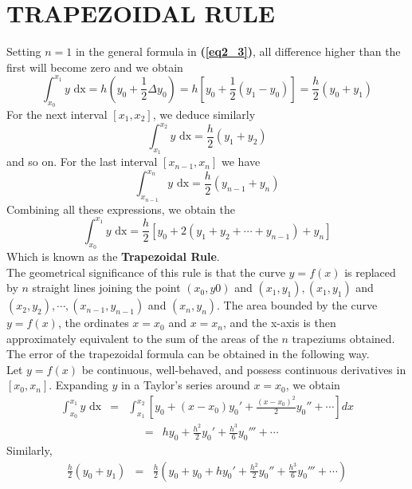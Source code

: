 \documentclass[12pt]{report}
\newcommand{\sps}{\\[0.2cm]}
\newcommand{\refn}[1]{\textbf{(\ref{#1})}}
\newcommand{\bt}[1]{\textbf{#1}}
\newcommand{\sprime}{'}
\newcommand{\dprime}{''}
\newcommand{\tprime}{'''}
\begin{document}
	\section{TRAPEZOIDAL RULE}
	Setting $n=1$ in the general formula in \refn{eq2_3}, all difference higher than the first will become zero and we obtain
	\begin{equation}
		\int_{x_0}^{x_1} y \text{ dx} = h(y_0 + \frac{1}{2}\Delta y_0) = h \left[ y_0 + \frac{1}{2} (y_1 - y_0) \right] = \frac{h}{2}(y_0 + y_1)
		\label{eq3_1}
	\end{equation}
	For the next interval $[x_1, x_2]$, we deduce similarly
	\begin{equation}
		\int_{x_1}^{x_2} y\text{ dx} = \frac{h}{2} (y_1+y_2)
		\label{eq3_2}
	\end{equation}
	and so on. For the last interval $[x_{n-1}, x_n]$ we have
	\begin{equation}
		\int_{x_{n-1}}^{x_n} y\text{ dx} = \frac{h}{2}(y_{n-1} + y_n)
		\label{eq3_3}
	\end{equation}
	Combining all these expressions, we obtain the
	\begin{equation}
		\int_{x_0}^{x_1} y\text{ dx} = \frac{h}{2}\left[ y_0 + 2(y_1 + y_2 + \cdots + y_{n-1}) + y_n \right]
		\label{eq3_4}
	\end{equation}
	Which is known as the \bt{Trapezoidal Rule}.\sps
	The geometrical significance of this rule is that the curve $y=f(x)$ is replaced by $n$ straight lines joining the point $(x_0,y0)$ and $(x_1,y_1), (x_1,y_1)$ and $(x_2,y_2), \cdots,(x_{n-1}, y_{n-1})$ and $(x_n, y_n)$. The area bounded by the curve $y=f(x)$, the ordinates $x=x_0$ and $x=x_n$, and the x-axis is then approximately equivalent to the sum of the areas of the $n$ trapeziums obtained. The error of the trapezoidal formula can be obtained in the following way.\sps
	Let $y=f(x)$ be continuous, well-behaved, and possess continuous derivatives in $[x_0, x_n]$. Expanding $y$ in a Taylor's series around $x=x_0$, we obtain
	\begin{eqnarray*}
		\int_{x_0}^{x_1}y\text{ dx} &=& \int_{x_1}^{x_2}\left[y_0 + (x-x_0)y_0\sprime + \frac{(x-x_0)^2}{2}y_0\dprime + \cdots \right]dx
	\end{eqnarray*}
	\begin{eqnarray}
		&=& hy_0 + \frac{h^2}{2}y_0\sprime + \frac{h^3}{6}y_0\tprime + \cdots
		\label{eq3_5}
	\end{eqnarray}
	Similarly,
	\begin{eqnarray*}
		\frac{h}{2}(y_0 + y_1) &=& \frac{h}{2}(y_0 + y_0 + hy_0\sprime + \frac{h^2}{2}y_0\dprime + \frac{h^3}{6}y_0\tprime + \cdots)
	\end{eqnarray*}
\end{document}

